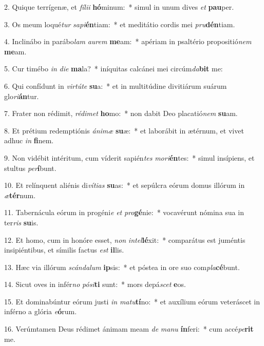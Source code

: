 2. Quique terrígenæ, et \textit{fí}\textit{li}\textit{i} \textbf{hó}minum:~*  simul in unum dives \textit{et} \textbf{pau}per.\

3. Os meum loqué\textit{tur} \textit{sa}\textit{pi}\textbf{én}tiam:~*  et meditátio cordis mei \textit{pru}\textbf{dén}tiam.\

4. Inclinábo in parábo\textit{lam} \textit{au}\textit{rem} \textbf{me}am:~*  apériam in psaltério propositió\textit{nem} \textbf{me}am.\

5. Cur timébo \textit{in} \textit{di}\textit{e} \textbf{ma}la?~*  iníquitas calcánei mei circúm\textit{da}\textbf{bit} me:\

6. Qui confídunt in \textit{vir}\textit{tú}\textit{te} \textbf{su}a:~*  et in multitúdine divitiárum suárum glo\textit{ri}\textbf{án}tur.\

7. Frater non rédimit, \textit{réd}\textit{i}\textit{met} \textbf{ho}mo:~*  non dabit Deo placatió\textit{nem} \textbf{su}am.\

8. Et prétium redemptiónis \textit{á}\textit{ni}\textit{mæ} \textbf{su}æ:~*  et laborábit in ætérnum, et vivet adhuc \textit{in} \textbf{fi}nem.\

9. Non vidébit intéritum, cum víderit sapién\textit{tes} \textit{mo}\textit{ri}\textbf{én}tes:~*  simul insípiens, et stultus \textit{per}\textbf{í}bunt.\

10. Et relínquent aliénis di\textit{ví}\textit{ti}\textit{as} \textbf{su}as:~*  et sepúlcra eórum domus illórum in \textit{æ}\textbf{tér}num.\

11. Tabernácula eórum in progéni\textit{e} \textit{et} \textit{pro}\textbf{gé}nie:~*  vocavérunt nómina sua in ter\textit{ris} \textbf{su}is.\

12. Et homo, cum in honóre esset, \textit{non} \textit{in}\textit{tel}\textbf{lé}xit:~*  comparátus est juméntis insipiéntibus, et símilis factus \textit{est} \textbf{il}lis.\

13. Hæc via illórum \textit{scán}\textit{da}\textit{lum} \textbf{ip}sis:~*  et póstea in ore suo com\textit{pla}\textbf{cé}bunt.\

14. Sicut oves in infér\textit{no} \textit{pó}\textit{si}\textbf{ti} sunt:~*  mors depá\textit{scet} \textbf{e}os.\

15. Et dominabúntur eórum justi \textit{in} \textit{ma}\textit{tu}\textbf{tí}no:~*  et auxílium eórum veteráscet in inférno a glória \textit{e}\textbf{ó}rum.\

16. Verúmtamen Deus rédimet ánimam meam \textit{de} \textit{ma}\textit{nu} \textbf{ín}feri:~*  cum accé\textit{pe}\textbf{rit} me.\

